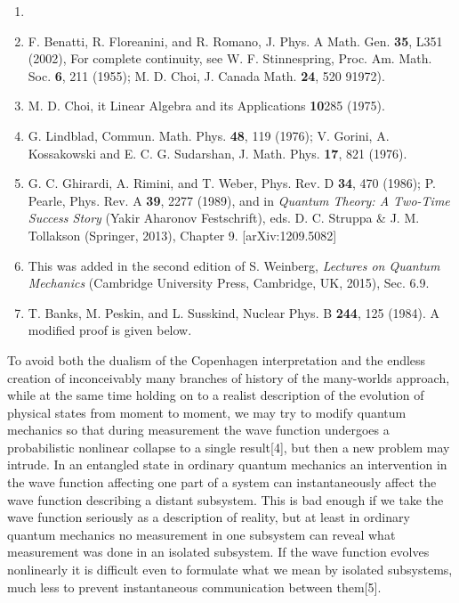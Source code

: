   
\begin{enumerate}
\item 
\item F. Benatti, R. Floreanini, and R. Romano, J. Phys. A Math. Gen. {\bf 35}, L351 (2002),  For complete continuity, see W. F. Stinnespring, Proc. Am. Math. Soc. {\bf 6}, 211 (1955); M. D. Choi, J. Canada Math. {\bf 24}, 520 91972).
\item M. D. Choi, {it Linear Algebra and its Applications} {\bf 10}285 (1975).
\item G. Lindblad, Commun. Math. Phys. {\bf 48}, 119 (1976); V. Gorini, A. Kossakowski and E. C. G. Sudarshan, J. Math. Phys. {\bf 17}, 821 (1976). 
\item G. C. Ghirardi, A. Rimini,
and T. Weber, Phys. Rev. D {\bf 34}, 470 (1986);  P. Pearle, Phys. Rev. A {\bf 39}, 2277 (1989), and in {\em Quantum Theory: A Two-Time Success Story} (Yakir Aharonov Festschrift), eds. D. C. Struppa \& J. M. Tollakson (Springer, 2013), Chapter 9. [arXiv:1209.5082]
\item This was added in the second edition of S. Weinberg, {\em Lectures on Quantum Mechanics} (Cambridge University Press, 
Cambridge, UK,  2015), Sec. 6.9.
\item T. Banks, M. Peskin, and L. Susskind, Nuclear Phys. B {\bf 244}, 125 (1984). A modified proof is given below.


\end{enumerate}


 


To avoid both the dualism of the Copenhagen interpretation and   the endless creation of inconceivably many branches of history of the many-worlds approach, while at the same time holding on to a realist description of the evolution of physical states from moment to moment,  we may try to modify quantum mechanics so that during measurement the wave function undergoes a probabilistic nonlinear collapse to a single result[4], but then a new problem may intrude.  In an entangled state in ordinary quantum mechanics  an intervention in the wave function affecting one part of a system can instantaneously affect the wave function describing a distant subsystem.  This is bad enough if we take the wave function seriously as a description of reality, but at least in ordinary quantum mechanics no measurement in one subsystem can reveal what measurement was done in an isolated subsystem.  If the wave function evolves nonlinearly it is difficult even to formulate what we mean by isolated subsystems, much less to prevent instantaneous communication between them[5].  

